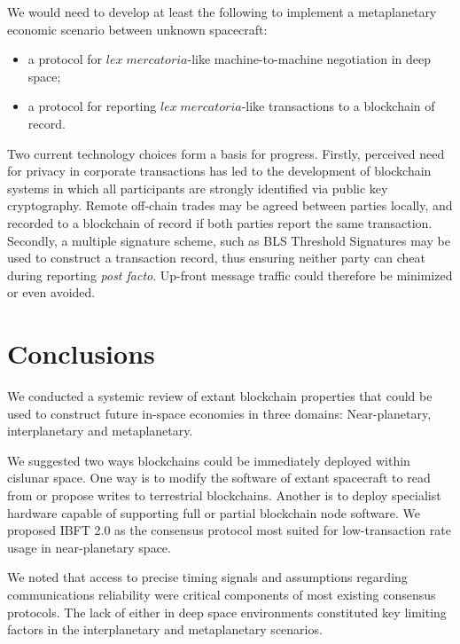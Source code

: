 \documentclass[]{aiaa-tc}%
\begin{document}
We would need to develop at least the following to implement a metaplanetary economic scenario between unknown spacecraft:

\begin{itemize}
\item a protocol for $\mathit{lex\; mercatoria}$-like machine-to-machine negotiation in deep space;
\item a protocol for reporting $\mathit{lex\; mercatoria}$-like transactions to a blockchain of record.
\end{itemize}

Two current technology choices form a basis for progress. Firstly, perceived need for privacy in corporate transactions has led to the development of blockchain systems in which all participants are strongly identified via public key cryptography. Remote off-chain trades may be agreed between parties locally, and recorded to a blockchain of record if both parties report the same transaction. Secondly, a multiple signature scheme, such as BLS Threshold Signatures\cite{boldyreva2003threshold} may be used to construct a transaction record, thus ensuring neither party can cheat during reporting \textit{post facto}. Up-front message traffic could therefore be minimized or even avoided.


\section{Conclusions}

We conducted a systemic review of extant blockchain properties that could be used to construct future in-space economies in three domains: Near-planetary, interplanetary and metaplanetary.

We suggested two ways blockchains could be immediately deployed within cislunar space. One way is to modify the software of extant spacecraft to read from or propose writes to terrestrial blockchains. Another is to deploy specialist hardware capable of supporting full or partial blockchain node software. We proposed IBFT 2.0 as the consensus protocol most suited for low-transaction rate usage in near-planetary space.

We noted that access to precise timing signals and assumptions regarding communications reliability were critical components of most existing consensus protocols. The lack of either in deep space environments constituted key limiting factors in the interplanetary and metaplanetary scenarios.
\end{document}
